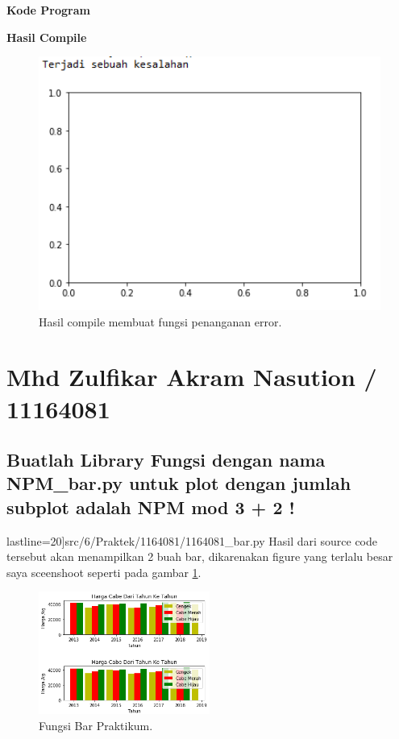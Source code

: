 \hfill \break
\textbf{Kode Program}



\hfill \break
\textbf{Hasil Compile}

\begin{figure}[H]
	\includegraphics[width=12cm]{figures/6/Praktek/1174038/error.png}
	\centering
	\caption{Hasil compile membuat fungsi penanganan error.}
\end{figure}

\section{Mhd Zulfikar Akram Nasution / 11164081}
\subsection{ Buatlah Library Fungsi dengan nama NPM\_bar.py untuk plot dengan jumlah subplot adalah NPM mod 3 + 2 !}
 lastline=20]{src/6/Praktek/1164081/1164081_bar.py}
Hasil dari source code tersebut akan menampilkan 2 buah bar, dikarenakan figure yang terlalu besar saya sceenshoot seperti pada gambar \ref{1164081_1}.

	\begin{figure}[!htbp!]	
		\centerline{\includegraphics[width=0.5\textwidth]{figures/6/Praktek/1164081/1164081_1.png}}
		\caption{Fungsi Bar Praktikum.}
		\label{1164081_1}
	\end{figure}
